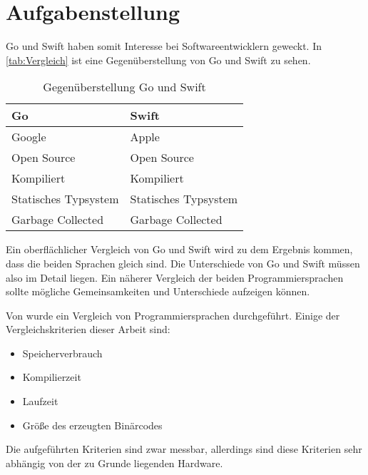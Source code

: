 \section{Aufgabenstellung}
Go und Swift haben somit Interesse bei Softwareentwicklern geweckt.
In \autoref{tab:Vergleich} ist eine Gegenüberstellung von Go und Swift zu sehen.

\begin{table}[H]
    \centering
    \begin{tabularx}{\textwidth}{|X|X|}
    \hline 
    \rowcolor[gray]{0.75} \textbf{Go} & \textbf{Swift} \\
    \hline
	Google & Apple \\
	\hline
	Open Source & Open Source \\
	\hline
	Kompiliert & Kompiliert \\
	\hline  
	Statisches Typsystem & Statisches Typsystem \\
	\hline
	Garbage Collected & Garbage Collected \\
    \hline
    \end{tabularx}
    \caption{Gegenüberstellung Go und Swift}
    \label{tab:Vergleich}
\end{table}

Ein oberflächlicher Vergleich von Go und Swift wird zu dem Ergebnis kommen, dass die beiden Sprachen gleich sind.
Die Unterschiede von Go und Swift müssen also im Detail liegen.
Ein näherer Vergleich der beiden Programmiersprachen sollte mögliche Gemeinsamkeiten und Unterschiede aufzeigen können.

Von \cite{Comparsion} wurde ein Vergleich von Programmiersprachen durchgeführt.
Einige der Vergleichskriterien dieser Arbeit sind:

\begin{itemize}
    \item Speicherverbrauch
    \item Kompilierzeit
    \item Laufzeit
    \item Größe des erzeugten Binärcodes
\end{itemize}

Die aufgeführten Kriterien sind zwar messbar, allerdings sind diese Kriterien sehr abhängig von der zu Grunde liegenden Hardware.

